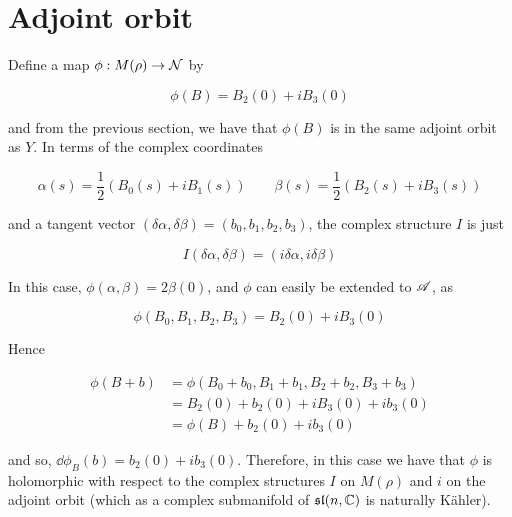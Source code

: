 \documentclass{report}
\renewcommand{\sl}{\mathfrak{sl}}
\begin{document}
\section{Adjoint orbit}

Define a map \(\phi : M(\rho) \to \mathcal{N}\) by

\[\phi(B) = B_2(0) + iB_3(0)\]

and from the previous section, we have that \(\phi(B)\) is in the same adjoint orbit as \(Y\). In terms of the complex coordinates

\[\alpha(s) = \frac12(B_0(s) + iB_1(s)) \qquad \beta(s) = \frac12(B_2(s) + iB_3(s))\]

and a tangent vector \((\delta\alpha, \delta\beta) = (b_0, b_1, b_2, b_3)\), the complex structure \(I\) is just

\[I(\delta\alpha, \delta\beta) = (i\delta\alpha, i\delta\beta)\]

In this case, \(\phi(\alpha, \beta) = 2\beta(0)\), and \(\phi\) can easily be extended to \(\mathscr{A}\), as

\[\phi(B_0, B_1, B_2, B_3) = B_2(0) + iB_3(0)\]

Hence

\begin{align*}
    \phi(B + b) &= \phi(B_0 + b_0, B_1 + b_1, B_2 + b_2, B_3 + b_3) \\
    &= B_2(0) + b_2(0) + iB_3(0) + ib_3(0) \\
    &= \phi(B) + b_2(0) + ib_3(0) 
\end{align*}

and so, \(\dd\phi_B(b) = b_2(0) + ib_3(0)\). Therefore, in this case we have that \(\phi\) is holomorphic with respect to the complex structures \(I\) on \(M(\rho)\) and \(i\) on the adjoint orbit (which as a complex submanifold of \(\sl(n, \C)\) is naturally K\"ahler).





\printbibliography
\end{document}
